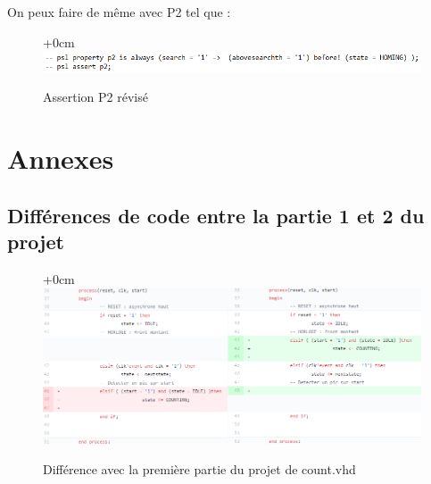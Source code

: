 \documentclass{article}
\begin{document}
On peux faire de même avec P2 tel que :

\begin{figure}[!h]
\advance\leftskip+0cm
\includegraphics[scale=0.6]{PSL/P2P.PNG}
\caption{Assertion P2 révisé }
\end{figure} 



\newpage
\section{Annexes}
\subsection{Différences de code entre la partie 1 et 2 du projet}

\begin{figure}[!h]
\advance\leftskip+0cm
\includegraphics[scale=0.6]{modifCount.PNG}
\caption{Différence avec la première partie du projet de count.vhd}
\end{figure} 
\end{document}
